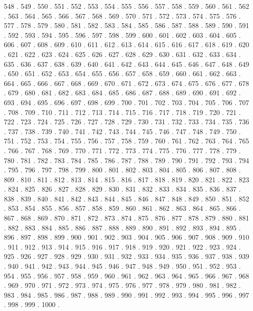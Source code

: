 \documentclass[10pt]{mybook4}
\begin{document}
\begin{Schunk}
\begin{Soutput}
548 . 549 . 550 . 551 . 552 . 553 . 554 . 555 . 556 . 557 . 558 . 559 . 560 . 561 . 562 . 563 . 564 . 565 . 566 . 567 . 568 . 569 . 570 . 571 . 572 . 573 . 574 . 575 . 576 . 577 . 578 . 579 . 580 . 581 . 582 . 583 . 584 . 585 . 586 . 587 . 588 . 589 . 590 . 591 . 592 . 593 . 594 . 595 . 596 . 597 . 598 . 599 . 600 . 601 . 602 . 603 . 604 . 605 . 606 . 607 . 608 . 609 . 610 . 611 . 612 . 613 . 614 . 615 . 616 . 617 . 618 . 619 . 620 . 621 . 622 . 623 . 624 . 625 . 626 . 627 . 628 . 629 . 630 . 631 . 632 . 633 . 634 . 635 . 636 . 637 . 638 . 639 . 640 . 641 . 642 . 643 . 644 . 645 . 646 . 647 . 648 . 649 . 650 . 651 . 652 . 653 . 654 . 655 . 656 . 657 . 658 . 659 . 660 . 661 . 662 . 663 . 664 . 665 . 666 . 667 . 668 . 669 . 670 . 671 . 672 . 673 . 674 . 675 . 676 . 677 . 678 . 679 . 680 . 681 . 682 . 683 . 684 . 685 . 686 . 687 . 688 . 689 . 690 . 691 . 692 . 693 . 694 . 695 . 696 . 697 . 698 . 699 . 700 . 701 . 702 . 703 . 704 . 705 . 706 . 707 . 708 . 709 . 710 . 711 . 712 . 713 . 714 . 715 . 716 . 717 . 718 . 719 . 720 . 721 . 722 . 723 . 724 . 725 . 726 . 727 . 728 . 729 . 730 . 731 . 732 . 733 . 734 . 735 . 736 . 737 . 738 . 739 . 740 . 741 . 742 . 743 . 744 . 745 . 746 . 747 . 748 . 749 . 750 . 751 . 752 . 753 . 754 . 755 . 756 . 757 . 758 . 759 . 760 . 761 . 762 . 763 . 764 . 765 . 766 . 767 . 768 . 769 . 770 . 771 . 772 . 773 . 774 . 775 . 776 . 777 . 778 . 779 . 780 . 781 . 782 . 783 . 784 . 785 . 786 . 787 . 788 . 789 . 790 . 791 . 792 . 793 . 794 . 795 . 796 . 797 . 798 . 799 . 800 . 801 . 802 . 803 . 804 . 805 . 806 . 807 . 808 . 809 . 810 . 811 . 812 . 813 . 814 . 815 . 816 . 817 . 818 . 819 . 820 . 821 . 822 . 823 . 824 . 825 . 826 . 827 . 828 . 829 . 830 . 831 . 832 . 833 . 834 . 835 . 836 . 837 . 838 . 839 . 840 . 841 . 842 . 843 . 844 . 845 . 846 . 847 . 848 . 849 . 850 . 851 . 852 . 853 . 854 . 855 . 856 . 857 . 858 . 859 . 860 . 861 . 862 . 863 . 864 . 865 . 866 . 867 . 868 . 869 . 870 . 871 . 872 . 873 . 874 . 875 . 876 . 877 . 878 . 879 . 880 . 881 . 882 . 883 . 884 . 885 . 886 . 887 . 888 . 889 . 890 . 891 . 892 . 893 . 894 . 895 . 896 . 897 . 898 . 899 . 900 . 901 . 902 . 903 . 904 . 905 . 906 . 907 . 908 . 909 . 910 . 911 . 912 . 913 . 914 . 915 . 916 . 917 . 918 . 919 . 920 . 921 . 922 . 923 . 924 . 925 . 926 . 927 . 928 . 929 . 930 . 931 . 932 . 933 . 934 . 935 . 936 . 937 . 938 . 939 . 940 . 941 . 942 . 943 . 944 . 945 . 946 . 947 . 948 . 949 . 950 . 951 . 952 . 953 . 954 . 955 . 956 . 957 . 958 . 959 . 960 . 961 . 962 . 963 . 964 . 965 . 966 . 967 . 968 . 969 . 970 . 971 . 972 . 973 . 974 . 975 . 976 . 977 . 978 . 979 . 980 . 981 . 982 . 983 . 984 . 985 . 986 . 987 . 988 . 989 . 990 . 991 . 992 . 993 . 994 . 995 . 996 . 997 . 998 . 999 . 1000 . 
\end{Soutput}
\end{Schunk}
 
\end{document}
